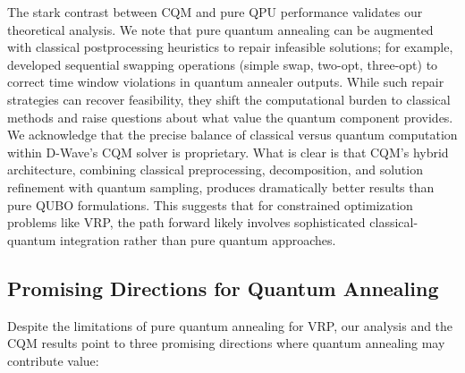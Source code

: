 \documentclass[preprint,3p,12pt,authoryear]{elsarticle}
\begin{document}
The stark contrast between CQM and pure QPU performance validates our theoretical analysis. We note that pure quantum annealing can be augmented with classical postprocessing heuristics to repair infeasible solutions; for example, \citet{holliday2025advanced} developed sequential swapping operations (simple swap, two-opt, three-opt) to correct time window violations in quantum annealer outputs. While such repair strategies can recover feasibility, they shift the computational burden to classical methods and raise questions about what value the quantum component provides. We acknowledge that the precise balance of classical versus quantum computation within D-Wave's CQM solver is proprietary. What is clear is that CQM's hybrid architecture, combining classical preprocessing, decomposition, and solution refinement with quantum sampling, produces dramatically better results than pure QUBO formulations. This suggests that for constrained optimization problems like VRP, the path forward likely involves sophisticated classical-quantum integration rather than pure quantum approaches.

\subsection{Promising Directions for Quantum Annealing}

Despite the limitations of pure quantum annealing for VRP, our analysis and the CQM results point to three promising directions where quantum annealing may contribute value:
\end{document}
